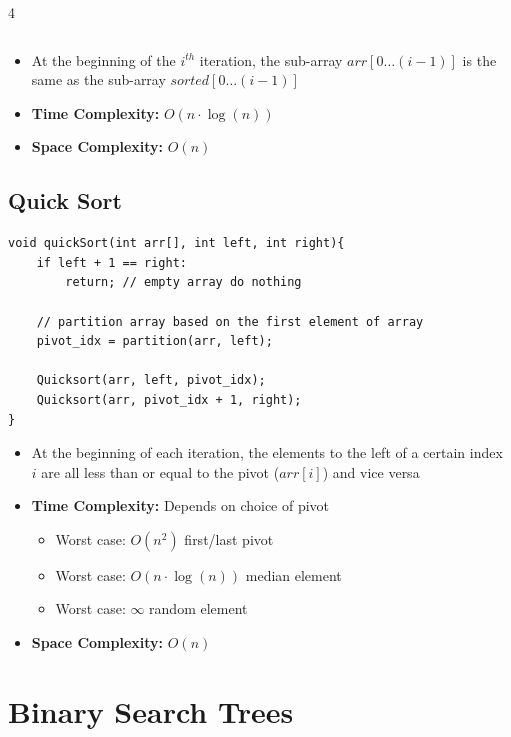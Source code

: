 \documentclass[fontsize=6pt, landscape, a4paper]{scrartcl}
\begin{document}
\begin{multicols*}{4}
\begin{lstlisting}
\end{lstlisting}

    \begin{itemize}
        \item At the beginning of the $i^{th}$ iteration, the sub-array $arr[0 \dots (i-1)]$
              is the same as the sub-array $sorted[0 \dots (i-1)]$
        \item \textbf{Time Complexity:} $O(n\cdot \log(n))$
        \item \textbf{Space Complexity:} $O(n)$
    \end{itemize}

    \subsection*{Quick Sort}
    \begin{lstlisting}
void quickSort(int arr[], int left, int right){
    if left + 1 == right:
        return; // empty array do nothing
        
    // partition array based on the first element of array
    pivot_idx = partition(arr, left);

    Quicksort(arr, left, pivot_idx);
    Quicksort(arr, pivot_idx + 1, right);
}

\end{lstlisting}

    \begin{itemize}
        \item At the beginning of each iteration, the elements to the left of a certain index
              $i$ are all less than or equal to the pivot ($arr[i]$) and vice versa
        \item \textbf{Time Complexity:} Depends on choice of pivot
              \begin{itemize}
                  \item Worst case: $O(n^{2})$ first/last pivot
                  \item Worst case: $O(n \cdot \log(n))$ median element
                  \item Worst case: $\infty$ random element
              \end{itemize}
        \item \textbf{Space Complexity:} $O(n)$
    \end{itemize}

    \section*{Binary Search Trees}

\end{multicols*}
\end{document}
